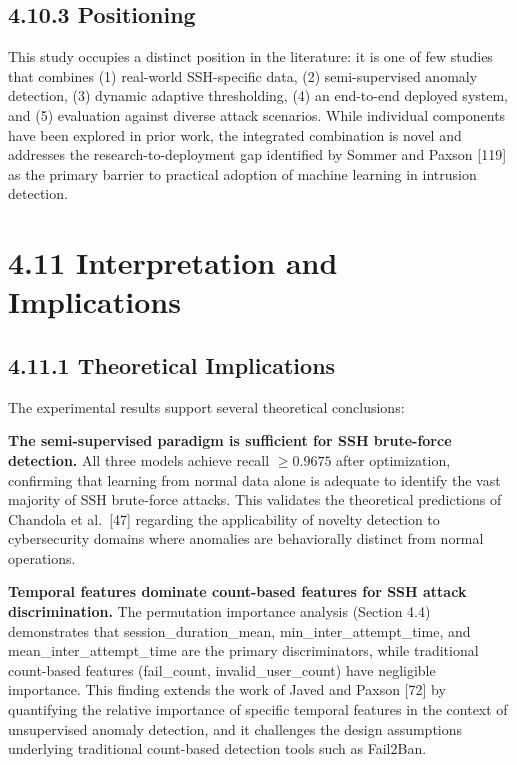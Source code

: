\documentclass[
  a4paper]{report}
\begin{document}
\subsection{4.10.3 Positioning}\label{positioning}

This study occupies a distinct position in the literature: it is one of
few studies that combines (1) real-world SSH-specific data, (2)
semi-supervised anomaly detection, (3) dynamic adaptive thresholding,
(4) an end-to-end deployed system, and (5) evaluation against diverse
attack scenarios. While individual components have been explored in
prior work, the integrated combination is novel and addresses the
research-to-deployment gap identified by Sommer and Paxson {[}119{]} as
the primary barrier to practical adoption of machine learning in
intrusion detection.

\section{4.11 Interpretation and
Implications}\label{interpretation-and-implications}

\subsection{4.11.1 Theoretical
Implications}\label{theoretical-implications}

The experimental results support several theoretical conclusions:

\textbf{The semi-supervised paradigm is sufficient for SSH brute-force
detection.} All three models achieve recall \(\geq 0.9675\) after
optimization, confirming that learning from normal data alone is
adequate to identify the vast majority of SSH brute-force attacks. This
validates the theoretical predictions of Chandola et al.~{[}47{]}
regarding the applicability of novelty detection to cybersecurity
domains where anomalies are behaviorally distinct from normal
operations.

\textbf{Temporal features dominate count-based features for SSH attack
discrimination.} The permutation importance analysis (Section 4.4)
demonstrates that session\_duration\_mean, min\_inter\_attempt\_time,
and mean\_inter\_attempt\_time are the primary discriminators, while
traditional count-based features (fail\_count, invalid\_user\_count)
have negligible importance. This finding extends the work of Javed and
Paxson {[}72{]} by quantifying the relative importance of specific
temporal features in the context of unsupervised anomaly detection, and
it challenges the design assumptions underlying traditional count-based
detection tools such as Fail2Ban.
\end{document}
